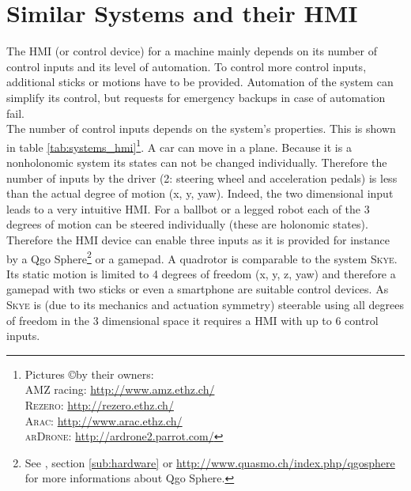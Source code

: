\section{Similar Systems and their HMI}
\label{sec:similar systems}
The HMI (or control device) for a machine mainly depends on its number of control inputs and its level of automation. To control more control inputs, additional sticks or motions have to be provided. Automation of the system can simplify its control, but requests for emergency backups in case of automation fail. \\
The number of control inputs depends on the system's properties. This is shown in table \ref{tab:systems_hmi}\footnote{Pictures \copyright by their owners: \\ \textsc{AMZ} racing: \url{http://www.amz.ethz.ch/} \\ \textsc{Rezero}: \url{http://rezero.ethz.ch/} \\ \textsc{Arac}: \url{http://www.arac.ethz.ch/} \\ \textsc{arDrone}: \url{http://ardrone2.parrot.com/}}. A car can move in a plane. Because it is a nonholonomic system its states can not be changed individually. Therefore the number of inputs by the driver (2: steering wheel and acceleration pedals) is less than the actual degree of motion (x, y, yaw). Indeed, the two dimensional input leads to a very intuitive HMI.
For a ballbot or a legged robot each of the 3 degrees of motion can be steered individually (these are holonomic states). Therefore the HMI device can enable three inputs as it is provided for instance by a Qgo Sphere\footnote{See \cite{kammermann}, section \ref{sub:hardware} or \url{http://www.quasmo.ch/index.php/qgosphere} for more informations about Qgo Sphere.} or a gamepad. A quadrotor is comparable to the system \textsc{Skye}. Its static motion is limited to 4 degrees of freedom (x, y, z, yaw) and therefore a gamepad with two sticks or even a smartphone are suitable control devices. As \textsc{Skye} is (due to its mechanics and actuation symmetry) steerable using all degrees of freedom in the 3 dimensional space it requires a HMI with up to 6 control inputs.
